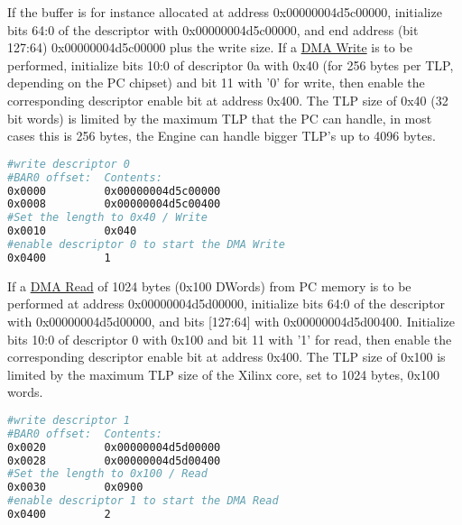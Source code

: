If the buffer is for instance allocated at address 0x00000004d5c00000, initialize bits 64:0 of the descriptor with 0x00000004d5c00000, and end address (bit 127:64) 0x00000004d5c00000 plus the write size. If a \underline{DMA Write} is to be performed, initialize bits 10:0 of descriptor 0a with 0x40 (for 256 bytes per TLP, depending on the PC chipset) and bit 11 with '0' for write, then enable the corresponding descriptor enable bit at address 0x400. The TLP size of 0x40 (32 bit words) is limited by the maximum TLP that the PC can handle, in most cases this is 256 bytes, the Engine can handle bigger TLP's up to 4096 bytes.
\begin{lstlisting}[language=BASH, frame=single, caption=Create a Write descriptor]
#write descriptor 0
#BAR0 offset:  Contents:
0x0000         0x00000004d5c00000
0x0008         0x00000004d5c00400
#Set the length to 0x40 / Write
0x0010         0x040
#enable descriptor 0 to start the DMA Write
0x0400         1
\end{lstlisting}
If a \underline{DMA Read} of 1024 bytes (0x100 DWords) from PC memory is to be performed at address 0x00000004d5d00000, initialize bits 64:0 of the descriptor with 0x00000004d5d00000, and bits [127:64] with 0x00000004d5d00400. Initialize bits 10:0 of descriptor 0 with 0x100 and bit 11 with '1' for read, then enable the corresponding descriptor enable bit at address 0x400. The TLP size of 0x100 is limited by the maximum TLP size of the Xilinx core, set to 1024 bytes, 0x100 words.
\begin{lstlisting}[language=BASH, frame=single, caption=Create a Read descriptor]
#write descriptor 1
#BAR0 offset:  Contents:
0x0020         0x00000004d5d00000
0x0028         0x00000004d5d00400
#Set the length to 0x100 / Read
0x0030         0x0900
#enable descriptor 1 to start the DMA Read
0x0400         2
\end{lstlisting}
\newpage
